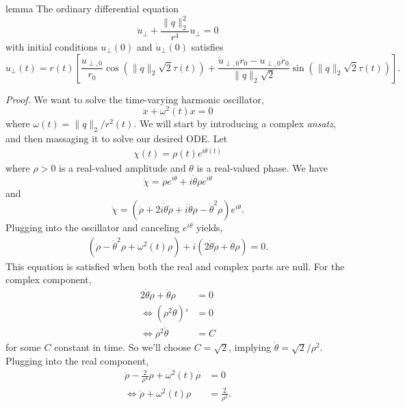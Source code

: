 \documentclass{article}
\begin{document}
\begin{restatable}{lemma}{} \label{lemma: time varying oscillator}
    The ordinary differential equation
    \[\ddot u_{\perp} + \frac{\|q\|_2^2}{r^4}u_\perp = 0\]
    with initial conditions $u_\perp(0)$ and $\dot u_\perp(0)$ satisfies 
    \[u_{\perp}(t) = r(t)\left[\frac{u_{\perp,0}}{r_0}\cos(\|q\|_2\sqrt{2}\tau(t)) + \frac{\dot u_{\perp,0} r_0 - u_{\perp,0} \dot r_0}{\|q\|_2\sqrt{2}}\sin(\|q\|_2\sqrt{2}\tau(t))\right].\]
\end{restatable}
\noindent \textit{Proof.} We want to solve the time-varying harmonic oscillator,
\begin{equation}
    \ddot x + \omega^2(t)x = 0
\end{equation}
where $\omega(t) = \|q\|_2/r^2(t).$ We will start by introducing a complex \textit{ansatz}, and then massaging it to solve our desired ODE. Let
\begin{align}
    \chi(t) = \rho(t)e^{i\theta(t)}
\end{align}
where $\rho >0$ is a real-valued amplitude and $\theta$ is a real-valued phase. We have
\begin{equation}
    \dot \chi = \dot \rho e^{i\theta} + i\dot\theta\rho e^{i\theta}
\end{equation}
and 
\begin{equation}
    \ddot \chi = \left(\ddot \rho  + 2i\dot \theta\dot\rho + i\ddot \theta\rho -\dot\theta^2\rho  \right)e^{i\theta}.
\end{equation}
Plugging into the oscillator and canceling $e^{i\theta}$ yields,
\begin{align}
    (\ddot \rho -\dot\theta^2\rho + \omega^2(t)
    \rho)  + i(2\dot \theta\dot\rho + \ddot \theta\rho) = 0.
\end{align}
This equation is satisfied when both the real and complex parts are null. For the complex component,
\begin{align*}
    2\dot \theta\dot\rho + \ddot \theta\rho &= 0 \\
    \iff (\rho^2\dot\theta)' &= 0 \\
    \iff \rho^2\dot\theta &= C 
\end{align*}
for some $C$ constant in time. So we'll choose $C = \sqrt{2}$, implying $\dot\theta = \sqrt{2}/\rho^2$. Plugging into the real component,
\begin{align*}
    \ddot \rho -\frac{2}{\rho^4}\rho + \omega^2(t)
    \rho &= 0 \\
    \iff\ddot \rho  + \omega^2(t)
    \rho &= \frac{2}{\rho^3}.
\end{align*}
\end{document}
